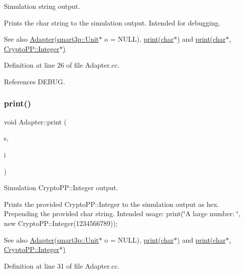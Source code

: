 Simulation string output. 

Prints the char string to the simulation output. Intended for debugging. \begin{DoxySeeAlso}{See also}
\hyperlink{classAdapter}{Adapter}(\hyperlink{classsmart3p_1_1Unit}{smart3p\+::\+Unit}$\ast$ o = N\+U\+LL), \hyperlink{classAdapter_af928c4508bc6a76e8f9b918d38ffd221}{print(char$\ast$)} and \hyperlink{classAdapter_a411c5677216438c68fc06f29909bf124}{print(char$\ast$, Crypto\+P\+P\+::\+Integer$\ast$)} 
\end{DoxySeeAlso}


Definition at line 26 of file Adapter.\+cc.



References D\+E\+B\+UG.

\mbox{\label{classAdapter_a411c5677216438c68fc06f29909bf124}} 
\subsubsection{\texorpdfstring{print()}{print()}\hspace{0.1cm}{\footnotesize\ttfamily [2/2]}}
{\footnotesize\ttfamily void Adapter\+::print (\begin{DoxyParamCaption}\item[{char $\ast$}]{s,  }\item[{Crypto\+P\+P\+::\+Integer $\ast$}]{i }\end{DoxyParamCaption})}



Simulation Crypto\+P\+P\+::\+Integer output. 

Prints the provided Crypto\+P\+P\+::\+Integer to the simulation output as hex. Prepending the provided char string. Intended usage\+: print(\char`\"{}\+A large number\+: \char`\"{}, new Crypto\+P\+P\+::\+Integer(1234566789)); \begin{DoxySeeAlso}{See also}
\hyperlink{classAdapter}{Adapter}(\hyperlink{classsmart3p_1_1Unit}{smart3p\+::\+Unit}$\ast$ o = N\+U\+LL), \hyperlink{classAdapter_af928c4508bc6a76e8f9b918d38ffd221}{print(char$\ast$)} and \hyperlink{classAdapter_a411c5677216438c68fc06f29909bf124}{print(char$\ast$, Crypto\+P\+P\+::\+Integer$\ast$)} 
\end{DoxySeeAlso}


Definition at line 31 of file Adapter.\+cc.



